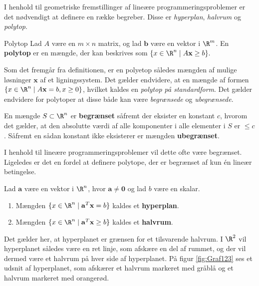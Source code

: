 I henhold til geometriske fremstillinger af lineære programmeringsproblemer er det nødvendigt at definere en række begreber.
Disse er \textit{hyperplan}, \textit{halvrum} og \textit{polytop}.
%
\begin{defn}{}{Polytop}
Lad $A$ være en $m \times n$ matrix, og lad $\mathbf{b}$ være en vektor i  $\R^m$.
En \textbf{polytop} er en mængde, der kan beskrives som 
$\{x\in \R^n \mid A\mathbf{x}\geq b\}.$
%
\end{defn}
\noindent
%
Som det fremgår fra definitionen, er en polyetop således mængden af mulige løsninger $\mathbf{x}$ af et ligningssystem.
Det gælder endvidere, at en mængde af formen $ \{x \in \R^n \mid A\textbf{x}=b,x \geq 0 \}$, hvilket kaldes en \textit{polytop på standardform}. 
%
Det gælder endvidere for polytoper at disse både kan være \textit{begrænsede} og \textit{ubegrænsede}.
%
\begin{defn}{}{}
En mængde $S \subset \R^n$ er \textbf{begrænset} såfremt der eksister en konstant $c$, hvorom det gælder, at den absolutte værdi af alle komponenter i alle elementer i $S$ er $\leq c$. 
Såfremt en sådan konstant ikke eksisterer er mængden \textbf{ubegrænset}. 
\end{defn}
\noindent
%
%
I henhold til lineære programmeringsproblemer vil dette ofte være begrænset.
Ligeledes er det en fordel at definere polytope, der er begrænset af kun én lineær betingelse. 
%
%
\begin{defn}{}{}
Lad $\mathbf{a}$ være en vektor i $\R^n$, hvor $\mathbf{a} \neq \mathbf{0}$ og lad $b$ være en skalar.
\begin{enumerate}[label=(\alph*)]
\item Mængden $\{x \in \R^n \mid \mathbf{a}^T \mathbf{x}=b\}$ kaldes et \textbf{hyperplan}.
\item Mængden $\{x \in \R^n \mid \mathbf{a}^T \mathbf{x} \geq b\}$ kaldes et \textbf{halvrum}.
\end{enumerate}
\end{defn}
\noindent
%
Det gælder her, at hyperplanet er grænsen for et tilsvarende halvrum.
I $\R^2$ vil hyperplanet således være en ret linje, som afskære en del af rummet, og der vil dermed være et halvrum på hver side af hyperplanet.
På figur \ref{fig:Graf123} ses et udsnit af hyperplanet, som afskærer et halvrum markeret med gråblå og et halvrum markeret med orangerød. 

